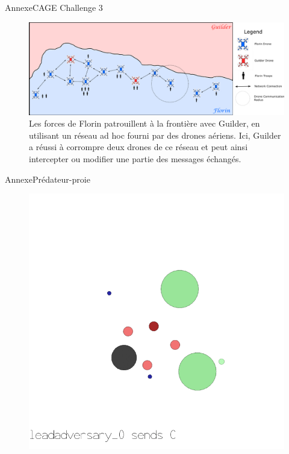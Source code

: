 \begin{frame}{Annexe}{CAGE Challenge 3}
    \begin{figure}
        \includegraphics[width=0.9\linewidth]{figures/cage_challenge_3.png}
        \caption*{Les forces de Florin patrouillent à la frontière avec Guilder, en utilisant un réseau ad hoc fourni par des drones aériens. Ici, Guilder a réussi à corrompre deux drones de ce réseau et peut ainsi intercepter ou modifier une partie des messages échangés.}
    \end{figure}
\end{frame}

\begin{frame}{Annexe}{Prédateur-proie}
    \begin{figure}
        \includegraphics[width=0.5\linewidth]{figures/mpe_simple_world_comm.png}
    \end{figure}
\end{frame}

